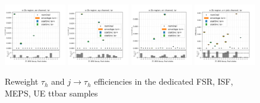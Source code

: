 \begin{figure}
    \includegraphics[width=0.24\textwidth]{appendices/ttSystReweighting/figures/afterCorr/icata3_ch0_isr.png}
    \includegraphics[width=0.24\textwidth]{appendices/ttSystReweighting/figures/afterCorr/icata3_ch1_isr.png}
    \includegraphics[width=0.24\textwidth]{appendices/ttSystReweighting/figures/afterCorr/icata3_ch2_isr.png}
    \includegraphics[width=0.24\textwidth]{appendices/ttSystReweighting/figures/afterCorr/icata3_ch3_isr.png}
    
    \caption{Reweight $\tau_h$ and $j \to \tau_h$ efficiencies in the dedicated FSR, ISF, MEPS, UE ttbar samples}
    \label{fig:appendix:reweighttt:effAfterCorrFSR}
\end{figure}




